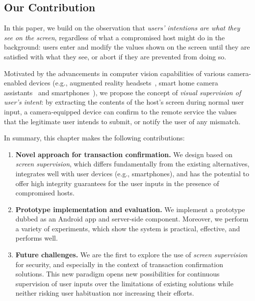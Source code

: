 \subsection{Our Contribution} In this paper, we build on the observation that \textit{users' intentions are what they see on the screen}, regardless of what a compromised host might do in the background: users enter and modify the values shown on the screen until they are satisfied with what they see, or abort if they are prevented from doing so.

Motivated by the advancements in computer vision capabilities of various camera-enabled devices (e.g., augmented reality headsets~\cite{TimCookAR, HoloLens2}, smart home camera assistants~\cite{fleck2008smart, lenovoSmartHome} and smartphones~\cite{wald2018real, smartphonesCV}), we propose the concept of \emph{visual supervision of user's intent}: by extracting the contents of the host's screen during normal user input, a camera-equipped device can confirm to the remote service the values that the legitimate user intends to submit, or notify the user of any mismatch.


In summary, this chapter makes the following contributions:

\begin{enumerate}

\item \textbf{Novel approach for transaction confirmation.} We design \sysname based on \emph{screen supervision}, which differs fundamentally from the existing alternatives, integrates well with user devices (e.g., smartphones), and has the potential to offer high integrity guarantees for the user inputs in the presence of compromised hosts.

\item \textbf{Prototype implementation and evaluation.} We implement a prototype dubbed \sysname as an Android app and server-side component. Moreover, we perform a variety of experiments, which show the system is practical, effective, and performs well. 

\item \textbf{Future challenges.} We are the first to explore the use of \emph{screen supervision} for security, and especially in the context of transaction confirmation solutions. This new paradigm opens new possibilities for continuous supervision of user inputs over the limitations of existing solutions while neither risking user habituation nor increasing their efforts.


\end{enumerate}

